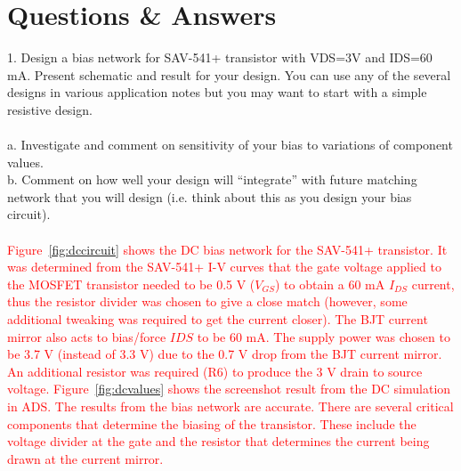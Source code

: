 \documentclass[conference]{IEEEtran}
\begin{document}
\section{Questions \& Answers}
1. Design a bias network for SAV-541+ transistor with VDS=3V and IDS=60 mA. Present schematic and result for your design. You can use any of the several designs in various application notes but you may want to start with a simple resistive design.\\\\
a. Investigate and comment on sensitivity of your bias to variations of component values.\\
b. Comment on how well your design will “integrate” with future matching network that you will design (i.e. think about this as you design your bias circuit).\\\\
\textcolor{red}{Figure~\ref{fig:dccircuit} shows the DC bias network for the SAV-541+ transistor.  It was determined from the SAV-541+ I-V curves that the gate voltage applied to the MOSFET transistor needed to be 0.5 V ($V_{GS}$) to obtain a 60 mA $I_{DS}$ current, thus the resistor divider was chosen to give a close match (however, some additional tweaking was required to get the current closer).   The BJT current mirror also acts to bias/force $I{DS}$ to be 60 mA.  The supply power was chosen to be 3.7 V (instead of 3.3 V) due to the 0.7 V drop from the BJT current mirror.  An additional resistor was required (R6) to produce the 3 V drain to source voltage.  Figure~\ref{fig:dcvalues} shows the screenshot result from the DC simulation in ADS.  The results from the bias network are accurate.  There are several critical components that determine the biasing of the transistor.  These include the voltage divider at the gate and the resistor that determines the current being drawn at the current mirror.}
\end{document}
